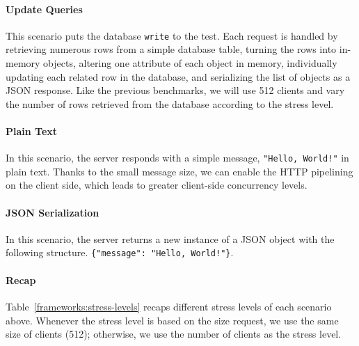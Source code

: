 \paragraph{Update Queries}
This scenario puts the database \texttt{write} to the test.
Each request is handled by retrieving numerous rows from a simple database table, turning the rows into in-memory objects, altering one attribute of each object in memory, individually updating each related row in the database, and serializing the list of objects as a JSON response.
Like the previous benchmarks, we will use 512 clients and vary the number of rows retrieved from the database according to the stress level.

\paragraph{Plain Text}
In this scenario, the server responds with a simple message, \texttt{"Hello, World!"} in plain text.
Thanks to the small message size, we can enable the HTTP pipelining on the client side, which leads to greater client-side concurrency levels.


\paragraph{JSON Serialization}
In this scenario, the server returns a new instance of a JSON object with the following structure. \texttt{\{"message": "Hello, World!"\}}.

\paragraph{Recap}

Table~\ref{frameworks:stress-levels} recaps different stress levels of each scenario above. Whenever the stress level is based on the size request, we use the same size of clients (512); otherwise, we use the number of clients as the stress level.

